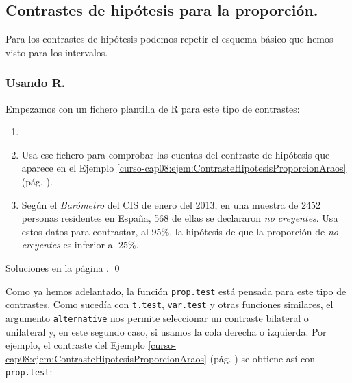 \documentclass[10pt,a4paper]{article}\usepackage[]{graphicx}\usepackage[]{color}
\newcounter {cont01}
\begin{document}
\subsection{Contrastes de hipótesis para la proporción.}
\label{tut08:subsec:ContrastesHipotesisProporcion}

Para los contrastes de hipótesis podemos repetir el esquema básico que hemos visto para los intervalos.

\subsubsection*{Usando R.}

Empezamos con un fichero plantilla de R para este tipo de contrastes:
    \begin{center}
    \end{center}


\begin{ejercicio}
\label{tut08:ejercicio02}
\begin{enumerate}
    \item[]
    \item Usa ese fichero para comprobar las cuentas del contraste de hipótesis que aparece en el Ejemplo \ref{curso-cap08:ejem:ContrasteHipotesisProporcionAraos} (pág. \pageref{curso-cap08:ejem:ContrasteHipotesisProporcionAraos}).
    \item Según el {\em Barómetro} del CIS de enero del 2013, en una muestra de 2452 personas residentes en España, 568 de ellas se declararon {\em no creyentes}. Usa estos datos para contrastar, al 95\%, la hipótesis de que la proporción de {\em no creyentes} es inferior al 25\%.
\end{enumerate}
Soluciones en la página \pageref{tut08:ejercicio02:sol}.
\qed
\end{ejercicio}

Como ya hemos adelantado, la función {\tt prop.test} está pensada para este tipo de contrastes. Como sucedía con {\tt t.test}, {\tt var.test} y otras funciones similares, el argumento {\tt alternative} nos permite seleccionar un contraste bilateral o unilateral y, en este segundo caso, si usamos la cola derecha o izquierda. Por ejemplo, el contraste del Ejemplo \ref{curso-cap08:ejem:ContrasteHipotesisProporcionAraos} (pág. \pageref{curso-cap08:ejem:ContrasteHipotesisProporcionAraos}) se obtiene así con {\tt prop.test}:
\end{document}
